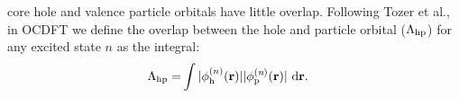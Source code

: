 \documentclass[8.5pt,twoside,twocolumn]{article}
\begin{document}
core hole and valence particle orbitals have little overlap. Following Tozer et al.,\cite{peach_excitation_2008} in OCDFT we define the overlap between the hole and particle orbital ($\Lambda_{\rm hp}$) for any excited state $n$ as the integral:
\begin{align}
\Lambda_{\rm hp} = &\int |\phi^{(n)}_{\rm h} (\bf{r})||\phi^{(\textit{n})}_{\rm p} (\bf{r})| \ \rm d\bf{r}  .
\end{align}

\end{document}
